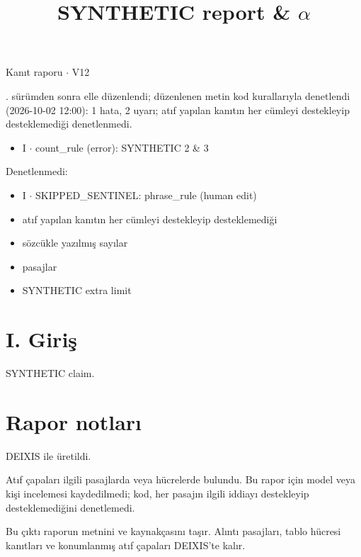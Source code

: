 \documentclass[journal]{IEEEtran}
\begin{document}
\renewcommand{\abstractname}{Özet}
\renewcommand{\IEEEkeywordsname}{Dizin Terimleri}
\renewcommand{\refname}{Kaynaklar}

\title{SYNTHETIC report \& \ensuremath{\alpha}}

\maketitle

\noindent Kanıt raporu \ensuremath{\cdot} V12

. sürümden sonra elle düzenlendi; düzenlenen metin kod kurallarıyla denetlendi (2026-10-02 12:00): 1 hata, 2 uyarı; atıf yapılan kanıtın her cümleyi destekleyip desteklemediği denetlenmedi.

\begin{itemize}
\item I \ensuremath{\cdot} count\_rule (error): SYNTHETIC 2 \& 3
\end{itemize}

\noindent Denetlenmedi:

\begin{itemize}
\item I \ensuremath{\cdot} SKIPPED\_SENTINEL: phrase\_rule (human edit)
\item atıf yapılan kanıtın her cümleyi destekleyip desteklemediği
\item sözcükle yazılmış sayılar
\item pasajlar
\item SYNTHETIC extra limit
\end{itemize}

\section*{I. Giriş}

SYNTHETIC claim. \cite{Synth26}

\section*{Rapor notları}

DEIXIS ile üretildi.

Atıf çapaları ilgili pasajlarda veya hücrelerde bulundu. Bu rapor için model veya kişi incelemesi kaydedilmedi; kod, her pasajın ilgili iddiayı destekleyip desteklemediğini denetlemedi.

Bu çıktı raporun metnini ve kaynakçasını taşır. Alıntı pasajları, tablo hücresi kanıtları ve konumlanmış atıf çapaları DEIXIS'te kalır.




\end{document}
